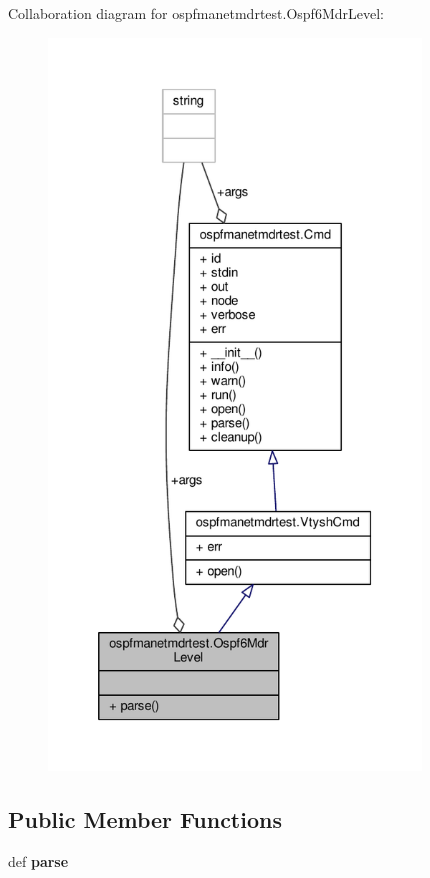 Collaboration diagram for ospfmanetmdrtest.\+Ospf6\+Mdr\+Level\+:
\nopagebreak
\begin{figure}[H]
\begin{center}
\leavevmode
\includegraphics[height=550pt]{classospfmanetmdrtest_1_1_ospf6_mdr_level__coll__graph}
\end{center}
\end{figure}
\subsection*{Public Member Functions}
\begin{DoxyCompactItemize}
\item 
\hypertarget{classospfmanetmdrtest_1_1_ospf6_mdr_level_a12e7cef0de983ecae4bf6e7ae51e018e}{def {\bfseries parse}}\label{classospfmanetmdrtest_1_1_ospf6_mdr_level_a12e7cef0de983ecae4bf6e7ae51e018e}

\end{DoxyCompactItemize}
